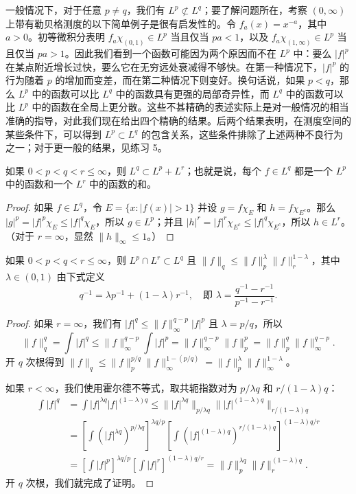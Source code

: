 \documentclass[lang=cn,10pt,thmcnt=section]{elegantbook}
\begin{document}
一般情况下，对于任意 $p \ne q$，我们有 $L^p \not\subset L^q$；要了解问题所在，考察 $(0,\infty)$ 上带有勒贝格测度的以下简单例子是很有启发性的。令 $f_a(x) = x^{-a}$，其中 $a>0$。初等微积分表明 $f_a \chi_{(0,1)} \in L^p$ 当且仅当 $pa<1$，以及 $f_a \chi_{(1,\infty)} \in L^p$ 当且仅当 $pa > 1$。因此我们看到一个函数可能因为两个原因而不在 $L^p$ 中：要么 $|f|^p$ 在某点附近增长过快，要么它在无穷远处衰减得不够快。在第一种情况下，$|f|^p$ 的行为随着 $p$ 的增加而变差，而在第二种情况下则变好。换句话说，如果 $p < q$，那么 $L^p$ 中的函数可以比 $L^q$ 中的函数具有更强的局部奇异性，而 $L^q$ 中的函数可以比 $L^p$ 中的函数在全局上更分散。这些不甚精确的表述实际上是对一般情况的相当准确的指导，对此我们现在给出四个精确的结果。后两个结果表明，在测度空间的某些条件下，可以得到 $L^p \subset L^q$ 的包含关系，这些条件排除了上述两种不良行为之一；对于更一般的结果，见练习 5。

\begin{proposition}\label{prop6.9}
如果 $0 < p < q < r \le \infty$，则 $L^q \subset L^p + L^r$；也就是说，每个 $f \in L^q$ 都是一个 $L^p$ 中的函数和一个 $L^r$ 中的函数的和。
\end{proposition}
\begin{proof}
如果 $f \in L^q$，令 $E = \{x: |f(x)| > 1\}$ 并设 $g=f\chi_E$ 和 $h=f\chi_{E^c}$。那么 $|g|^p = |f|^p \chi_E \le |f|^q \chi_E$，所以 $g \in L^p$；并且 $|h|^r = |f|^r \chi_{E^c} \le |f|^q \chi_{E^c}$，所以 $h \in L^r$。（对于 $r=\infty$，显然 $\|h\|_\infty \le 1$。）
\end{proof}

\begin{proposition}\label{prop6.10}
如果 $0 < p < q < r \le \infty$，则 $L^p \cap L^r \subset L^q$ 且 $\|f\|_q \le \|f\|_p^\lambda \|f\|_r^{1-\lambda}$，其中 $\lambda \in (0,1)$ 由下式定义
\[ q^{-1} = \lambda p^{-1} + (1-\lambda)r^{-1}, \quad \text{即 } \lambda = \frac{q^{-1}-r^{-1}}{p^{-1}-r^{-1}}. \]
\end{proposition}
\begin{proof}
如果 $r=\infty$，我们有 $|f|^q \le \|f\|_\infty^{q-p}|f|^p$ 且 $\lambda = p/q$，所以
\[ \|f\|_q^q = \int |f|^q \le \|f\|_\infty^{q-p} \int |f|^p = \|f\|_\infty^{q-p}\|f\|_p^p = \|f\|_p^q \|f\|_\infty^{q-p}. \]
开 $q$ 次根得到 $\|f\|_q \le \|f\|_p^{p/q} \|f\|_\infty^{1-(p/q)} = \|f\|_p^\lambda \|f\|_\infty^{1-\lambda}$。

如果 $r < \infty$，我们使用霍尔德不等式，取共轭指数对为 $p/\lambda q$ 和 $r/(1-\lambda)q$：
\begin{align*}
\int |f|^q &= \int |f|^{\lambda q} |f|^{(1-\lambda)q} \le \| |f|^{\lambda q} \|_{p/\lambda q} \| |f|^{(1-\lambda)q} \|_{r/(1-\lambda)q} \\
&= \left[ \int (|f|^{\lambda q})^{p/\lambda q} \right]^{\lambda q/p} \left[ \int (|f|^{(1-\lambda)q})^{r/(1-\lambda)q} \right]^{(1-\lambda)q/r} \\
&= \left[ \int |f|^p \right]^{\lambda q/p} \left[ \int |f|^r \right]^{(1-\lambda)q/r} = \|f\|_p^{\lambda q} \|f\|_r^{(1-\lambda)q}.
\end{align*}
开 $q$ 次根，我们就完成了证明。
\end{proof}
\end{document}
